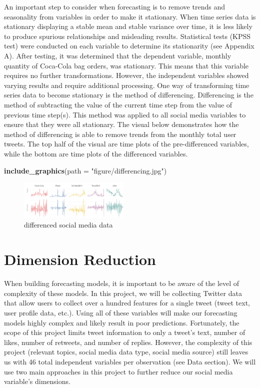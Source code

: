 \documentclass[12pt,oneside]{chicagocapstone}
\newenvironment{Shaded}{\begin{snugshade}}{\end{snugshade}}
\newcommand{\KeywordTok}[1]{\textcolor[rgb]{0.13,0.29,0.53}{\textbf{#1}}}
\newcommand{\DataTypeTok}[1]{\textcolor[rgb]{0.13,0.29,0.53}{#1}}
\newcommand{\StringTok}[1]{\textcolor[rgb]{0.31,0.60,0.02}{#1}}
\newcommand{\NormalTok}[1]{#1}
\begin{document}
An important step to consider when forecasting is to remove trends and
seasonality from variables in order to make it stationary. When time
series data is stationary displaying a stable mean and stable variance
over time, it is less likely to produce spurious relationships and
misleading results. Statistical tests (KPSS test) were conducted on each
variable to determine its stationarity (see Appendix A). After testing,
it was determined that the dependent variable, monthly quantity of
Coca-Cola bag orders, was stationary. This means that this variable
requires no further transformations. However, the independent variables
showed varying results and require additional processing. One way of
transforming time series data to become stationary is the method of
differencing. Differencing is the method of subtracting the value of the
current time step from the value of previous time step(s). This method
was applied to all social media variables to ensure that they were all
stationary. The visual below demonstrates how the method of differencing
is able to remove trends from the monthly total user tweets. The top
half of the visual are time plots of the pre-differenced variables,
while the bottom are time plots of the differenced variables.
\begin{Shaded}
\begin{Highlighting}[]
\KeywordTok{include_graphics}\NormalTok{(}\DataTypeTok{path =} \StringTok{"figure/differencing.jpg"}\NormalTok{)}
\end{Highlighting}
\end{Shaded}
\begin{figure}

{\centering \includegraphics[width=200px]{figure/differencing} 

}

\caption{differenced social media data}\label{fig:differencing}
\end{figure}
\section*{Dimension Reduction}\label{dimension-reduction}

When building forecasting models, it is important to be aware of the
level of complexity of these models. In this project, we will be
collecting Twitter data that allow users to collect over a hundred
features for a single tweet (tweet text, user profile data, etc.). Using
all of these variables will make our forecasting models highly complex
and likely result in poor predictions. Fortunately, the scope of this
project limits tweet information to only a tweet's text, number of
likes, number of retweets, and number of replies. However, the
complexity of this project (relevant topics, social media data type,
social media source) still leaves us with 46 total independent variables
per observation (see Data section). We will use two main approaches in
this project to further reduce our social media variable's dimensions.
\end{document}
